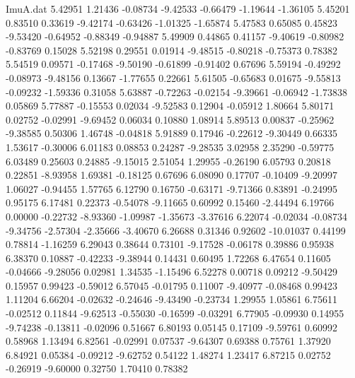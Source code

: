 \begin{filecontents}{ImuA.dat}
   5.42951    1.21436   -0.08734   -9.42533   -0.66479   -1.19644   -1.36105
   5.45201    0.83510    0.33619   -9.42174   -0.63426   -1.01325   -1.65874
   5.47583    0.65085    0.45823   -9.53420   -0.64952   -0.88349   -0.94887
   5.49909    0.44865    0.41157   -9.40619   -0.80982   -0.83769    0.15028
   5.52198    0.29551    0.01914   -9.48515   -0.80218   -0.75373    0.78382
   5.54519    0.09571   -0.17468   -9.50190   -0.61899   -0.91402    0.67696
   5.59194   -0.49292   -0.08973   -9.48156    0.13667   -1.77655    0.22661
   5.61505   -0.65683    0.01675   -9.55813   -0.09232   -1.59336    0.31058
   5.63887   -0.72263   -0.02154   -9.39661   -0.06942   -1.73838    0.05869
   5.77887   -0.15553    0.02034   -9.52583    0.12904   -0.05912    1.80664
   5.80171    0.02752   -0.02991   -9.69452    0.06034    0.10880    1.08914
   5.89513    0.00837   -0.25962   -9.38585    0.50306    1.46748   -0.04818
   5.91889    0.17946   -0.22612   -9.30449    0.66335    1.53617   -0.30006
   6.01183    0.08853    0.24287   -9.28535    3.02958    2.35290   -0.59775
   6.03489    0.25603    0.24885   -9.15015    2.51054    1.29955   -0.26190
   6.05793    0.20818    0.22851   -8.93958    1.69381   -0.18125    0.67696
   6.08090    0.17707   -0.10409   -9.20997    1.06027   -0.94455    1.57765
   6.12790    0.16750   -0.63171   -9.71366    0.83891   -0.24995    0.95175
   6.17481    0.22373   -0.54078   -9.11665    0.60992    0.15460   -2.44494
   6.19766    0.00000   -0.22732   -8.93360   -1.09987   -1.35673   -3.37616
   6.22074   -0.02034   -0.08734   -9.34756   -2.57304   -2.35666   -3.40670
   6.26688    0.31346    0.92602  -10.01037    0.44199    0.78814   -1.16259
   6.29043    0.38644    0.73101   -9.17528   -0.06178    0.39886    0.95938
   6.38370    0.10887   -0.42233   -9.38944    0.14431    0.60495    1.72268
   6.47654    0.11605   -0.04666   -9.28056    0.02981    1.34535   -1.15496
   6.52278    0.00718    0.09212   -9.50429    0.15957    0.99423   -0.59012
   6.57045   -0.01795    0.11007   -9.40977   -0.08468    0.99423    1.11204
   6.66204   -0.02632   -0.24646   -9.43490   -0.23734    1.29955    1.05861
   6.75611   -0.02512    0.11844   -9.62513   -0.55030   -0.16599   -0.03291
   6.77905   -0.09930    0.14955   -9.74238   -0.13811   -0.02096    0.51667
   6.80193    0.05145    0.17109   -9.59761    0.60992    0.58968    1.13494
   6.82561   -0.02991    0.07537   -9.64307    0.69388    0.75761    1.37920
   6.84921    0.05384   -0.09212   -9.62752    0.54122    1.48274    1.23417
   6.87215    0.02752   -0.26919   -9.60000    0.32750    1.70410    0.78382

\end{filecontents}
